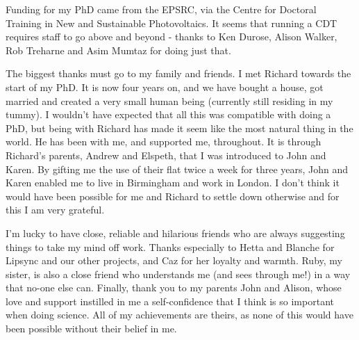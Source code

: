 Funding for my PhD came from the EPSRC, via the Centre for Doctoral Training in New and Sustainable Photovoltaics. It seems that running a CDT requires staff to go above and beyond - thanks to Ken Durose, Alison Walker, Rob Treharne and Asim Mumtaz for doing just that.

The biggest thanks must go to my family and friends. I met Richard towards the start of my PhD. It is now four years on, and we have bought a house, got married and created a very small human being (currently still residing in my tummy). I wouldn't have expected that all this was compatible with doing a PhD, but being with Richard has made it seem like the most natural thing in the world. He has been with me, and supported me, throughout. It is through Richard's parents, Andrew and Elspeth, that I was introduced to John and Karen. By gifting me the use of their flat twice a week for three years, John and Karen enabled me to live in Birmingham and work in London. I don't think it would have been possible for me and Richard to settle down otherwise and for this I am very grateful.

I'm lucky to have close, reliable and hilarious friends who are always suggesting things to take my mind off work. Thanks especially to Hetta and Blanche for Lipsync and our other projects, and Caz for her loyalty and warmth. Ruby, my sister, is also a close friend who understands me (and sees through me!) in a way that no-one else can. Finally, thank you to my parents John and Alison, whose love and support instilled in me a self-confidence that I think is so important when doing science. All of my achievements are theirs, as none of this would have been possible without their belief in me.